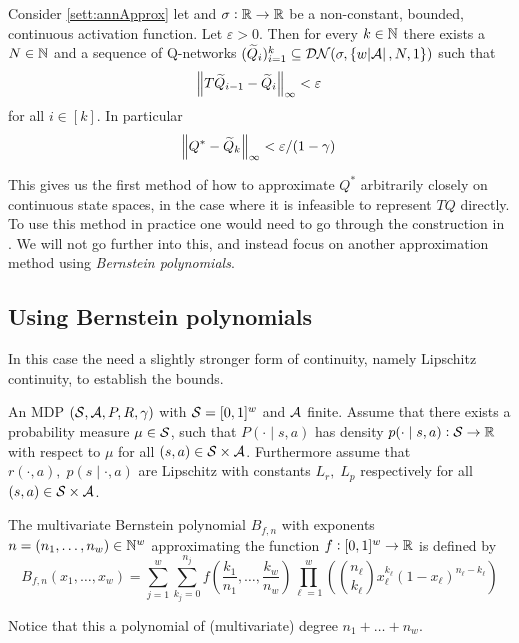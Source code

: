 \begin{prop}
  Consider \cref{sett:annApprox} let
  and $\sigma : \mathbb{R} \to \mathbb{R}$ be a non-constant, bounded, continuous
  activation function. Let $\varepsilon > 0$.
  Then for every $k \in \mathbb{N}$ there exists a $N\in \mathbb{N}$ and a sequence of
  Q-networks $(\widetilde{Q}_i)_{i=1}^k \subseteq \mathcal{DN}(\sigma,
  \{w \abs{\mathcal{A}}, N, 1\})$ such that
  \[ \norm{T\widetilde{Q}_{i-1} - \widetilde{Q}_i}_\infty < \varepsilon \]
  for all $i \in [k]$.
  In particular
  \[ \norm{Q^* - \widetilde{Q}_k}_\infty < \varepsilon/(1 - \gamma) \]
\end{prop}

This gives us the first method of how to approximate
$Q^*$ arbitrarily closely on continuous state spaces, in the case
where it is infeasible to represent $TQ$ directly.
To use this method in practice one would need to go through the
construction in . We will not go further into this,
and instead focus on another approximation method using
\emph{Bernstein polynomials}.

\subsection{Using Bernstein polynomials}

In this case the need a slightly stronger form of continuity, namely
Lipschitz continuity, to establish the bounds.

\begin{sett}
  An MDP $(\mathcal{S}, \mathcal{A}, P, R, \gamma)$ with
  $\mathcal{S} = [0,1]^w$ and $\mathcal{A}$ finite.
  Assume that there exists a probability measure $\mu \in \mathcal{S}$, such that
  $P(\cdot \mid s, a)$ has density
  $p(\cdot \mid s, a) : \mathcal{S} \to \mathbb{R}$ with respect to
  $\mu$ for all $(s, a) \in \mathcal{S}\times\mathcal{A}$. 
  Furthermore assume that $r(\cdot, a), \; p(s \mid \cdot, a)$ are
  Lipschitz
  with constants $L_r,\; L_p$ respectively for all
  $(s, a) \in \mathcal{S} \times \mathcal{A}$.
  \label{sett:polyApprox}
\end{sett}

\begin{defn}
  The multivariate Bernstein polynomial $B_{f, n}$ with exponents
  $n=(n_1, \dots, n_w) \in \mathbb{N}^w$ approximating the function $f:[0,1]^w \to \mathbb{R}$
  is defined by
  \begin{equation*}
    B_{f, n}(x_1, \dots, x_w) =
    \sum_{j = 1}^w \sum_{k_j = 0}^{n_j}
    f\left( \frac{k_1}{n_1}, \dots, \frac{k_w}{n_w} \right)
    \prod_{\ell = 1}^w \left(
    \binom{n_\ell}{k_\ell} x_\ell^{k_\ell}(1-x_\ell)^{n_\ell - k_\ell} \right)
  \end{equation*}
  \label{defn:Bfn}
\end{defn}
Notice that this a polynomial of (multivariate) degree $n_1 + \dots + n_w$.

